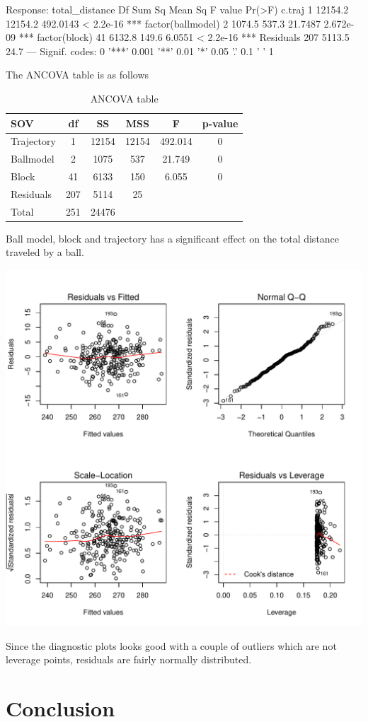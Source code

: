 \documentclass{article}\usepackage[]{graphicx}\usepackage[]{color}
\makeatletter
\def\maxwidth{ %
  \ifdim\Gin@nat@width>\linewidth
    \linewidth
  \else
    \Gin@nat@width
  \fi
}
\makeatother
\begin{document}
Response: total_distance
                   Df  Sum Sq Mean Sq  F value    Pr(>F)    
c.traj              1 12154.2 12154.2 492.0143 < 2.2e-16 ***
factor(ballmodel)   2  1074.5   537.3  21.7487 2.672e-09 ***
factor(block)      41  6132.8   149.6   6.0551 < 2.2e-16 ***
Residuals         207  5113.5    24.7                       
---
Signif. codes:  0 '***' 0.001 '**' 0.01 '*' 0.05 '.' 0.1 ' ' 1



The ANCOVA table is as follows

 \begin{table}[ht]
 \centering
 \begin{tabular}{lccccc}
 \hline
 SOV & df & SS & MSS & F & p-value\\
 \hline
 Trajectory &  1  & 12154 & 12154 & 492.014 &  0 \\
 Ballmodel & 2 &  1075 & 537 & 21.749 & 0\\
 Block &  41 & 6133 & 150 &  6.055 & 0\\
 Residuals  & 207 & 5114 & 25 &  &  \\
 Total     & 251 & 24476 &  &  &   \\
 \hline
 \end{tabular}
 \caption{ANCOVA table}
 \end{table}

Ball model, block and trajectory has a significant effect on the total distance traveled by a ball. 


\includegraphics[width=\maxwidth]{figure/diagnostic_plots-1} 


Since the diagnostic plots looks good with a couple of outliers which are not leverage points, residuals are fairly normally distributed.


\section*{Conclusion}
\end{document}
